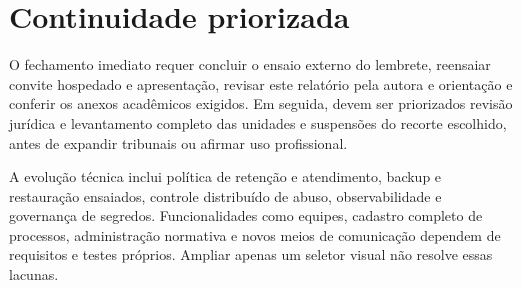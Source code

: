 \section{Continuidade priorizada}
\label{section-6-7}
O fechamento imediato requer concluir o ensaio externo do lembrete, reensaiar convite hospedado e apresentação, revisar este relatório pela autora e orientação e conferir os anexos acadêmicos exigidos. Em seguida, devem ser priorizados revisão jurídica e levantamento completo das unidades e suspensões do recorte escolhido, antes de expandir tribunais ou afirmar uso profissional.

A evolução técnica inclui política de retenção e atendimento, backup e restauração ensaiados, controle distribuído de abuso, observabilidade e governança de segredos. Funcionalidades como equipes, cadastro completo de processos, administração normativa e novos meios de comunicação dependem de requisitos e testes próprios. Ampliar apenas um seletor visual não resolve essas lacunas.
